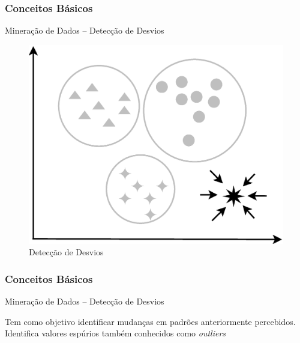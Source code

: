 \documentclass[hyperref={pdfpagelabels=false}]{beamer}
\begin{document}
\begin{frame}
	\frametitle{Conceitos Básicos}
    
    \Large{Mineração de Dados -- Detecção de Desvios}
    
        \begin{figure}
		\centering
	    \includegraphics[scale=0.3]{img/Outlier.eps}
        \caption{\scriptsize{Detecção de Desvios}}
		\end{figure}

\end{frame}

\begin{frame}

	\frametitle{Conceitos Básicos}
    
    \Large{Mineração de Dados -- Detecção de Desvios}\linebreak
    \normalsize
   
    Tem como objetivo identificar mudanças em padrões anteriormente percebidos. \cite{goldschmidt2015data}
    \linebreak\linebreak Identifica valores espúrios também conhecidos como \textit{outliers}

\end{frame}
\end{document}
